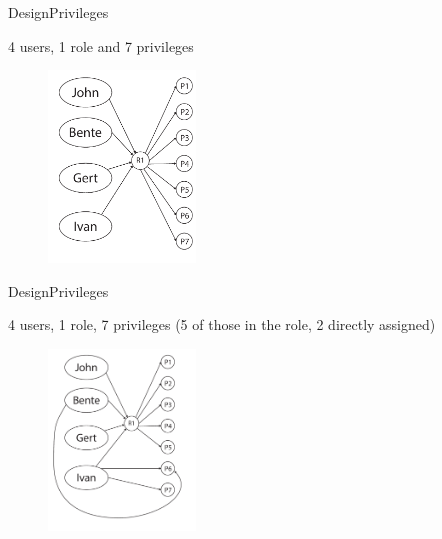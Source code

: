 \begin{frame}{Design}{Privileges}
  \begin{block}{}
  	4 users, 1 role and 7 privileges

  	\begin{figure}[htb]
    	\centering
    	\includegraphics[width=0.35\textwidth]{images/privileges3.pdf}
  	\end{figure}
  \end{block}
\end{frame}

\begin{frame}{Design}{Privileges}
  \begin{block}{}
  	4 users, 1 role, 7 privileges (5 of those in the role, 2 directly assigned)

  	\begin{figure}[htb]
    	\centering
    	\includegraphics[width=0.35\textwidth]{images/privileges4.pdf}
  	\end{figure}
  \end{block}
\end{frame}

